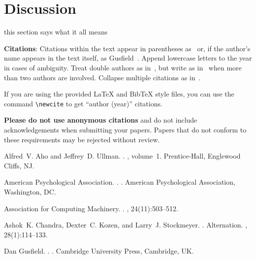 \documentclass[11pt]{article}
\begin{document}
\section{Discussion}

this section says what it all means

{\bf Citations}: Citations within the text appear in parentheses
as~\cite{Gusfield:97} or, if the author's name appears in the text
itself, as Gusfield~.  Append lowercase letters
to the year in cases of ambiguity.  Treat double authors as
in~\cite{Aho:72}, but write as in~\cite{Chandra:81} when more than two
authors are involved. Collapse multiple citations as
in~\cite{Gusfield:97,Aho:72}.

If you are using the provided \LaTeX{} and Bib\TeX{} style files, you
can use the command \verb|\newcite| to get ``author (year)'' citations.

\textbf{Please do not use anonymous citations} and do not include
acknowledgements when submitting your papers. Papers that do not
conform to these requirements may be rejected without review.

%
%

\begin{thebibliography}{}

Alfred~V. Aho and Jeffrey~D. Ullman.
.
, volume~1.
\newblock Prentice-{Hall}, Englewood Cliffs, NJ.

{American Psychological Association}.
.
.
\newblock American Psychological Association, Washington, DC.

{Association for Computing Machinery}.
.
, 24(11):503--512.

Ashok~K. Chandra, Dexter~C. Kozen, and Larry~J. Stockmeyer.
.
\newblock Alternation.
,
  28(1):114--133.

Dan Gusfield.
.
.
\newblock Cambridge University Press, Cambridge, UK.

\end{thebibliography}
\end{document}
